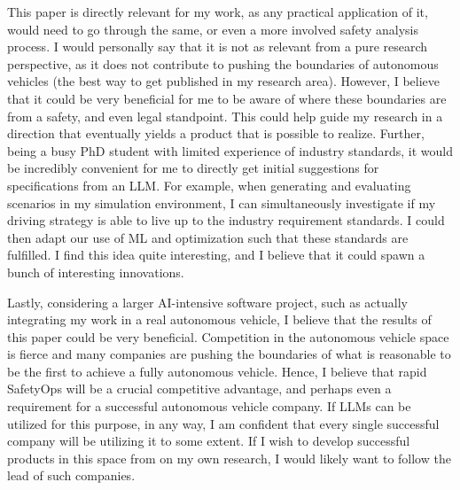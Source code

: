 \documentclass[a4paper,11pt]{article}
\begin{document}
This paper is directly relevant for my work, as any practical application of it, would need to go through the same, or even a more involved safety analysis process. I would personally say that it is not as relevant from a pure research perspective, as it does not contribute to pushing the boundaries of autonomous vehicles (the best way to get published in my research area). However, I believe that it could be very beneficial for me to be aware of where these boundaries are from a safety, and even legal standpoint. This could help guide my research in a direction that eventually yields a product that is possible to realize. Further, being a busy PhD student with limited experience of industry standards, it would be incredibly convenient for me to directly get initial suggestions for specifications from an LLM. For example, when generating and evaluating scenarios in my simulation environment, I can simultaneously investigate if my driving strategy is able to live up to the industry requirement standards. I could then adapt our use of ML and optimization such that these standards are fulfilled. I find this idea quite interesting, and I believe that it could spawn a bunch of interesting innovations.

Lastly, considering a larger AI-intensive software project, such as actually integrating my work in a real autonomous vehicle, I believe that the results of this paper could be very beneficial. Competition in the autonomous vehicle space is fierce and many companies are pushing the boundaries of what is reasonable to be the first to achieve a fully autonomous vehicle. Hence, I believe that rapid SafetyOps will be a crucial competitive advantage, and perhaps even a requirement for a successful autonomous vehicle company. If LLMs can be utilized for this purpose, in any way, I am confident that every single successful company will be utilizing it to some extent. If I wish to develop successful products in this space from on my own research, I would likely want to follow the lead of such companies.
\end{document}
